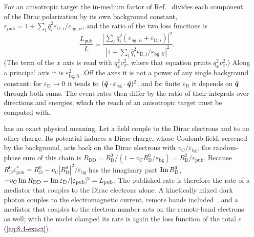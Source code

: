 For an anisotropic target the in-medium factor of Ref.~\cite[Eq.~(3.14)]{geilhufe2020dirac} divides each component of the Dirac polarization by its own background constant, $\varepsilon_{\mathrm{pub}} = 1 + \sum_i\hat q_i^2\varepsilon_{\mathrm{D},i}/\varepsilon_{\mathrm{bg},ii}$, and the ratio of the two loss functions is
\begin{equation}
  \frac{L_{\mathrm{pub}}}{L} = \frac{|\sum_i\hat q_i^2(\varepsilon_{\mathrm{bg},ii} + \varepsilon_{\mathrm{D},i})|^2}{|1 + \sum_i\hat q_i^2\varepsilon_{\mathrm{D},i}/\varepsilon_{\mathrm{bg},ii}|^2} .
  \label{eq:D.41-ratio}
\end{equation}
(The term of the $x$ axis is read with $q_x^2v_x^2$, where that equation prints $q_x^2v_z^2$.) Along a principal axis it is $\varepsilon_{\mathrm{bg},ii}^2$. Off the axes it is not a power of any single background constant: for $\varepsilon_{\mathrm{D}} \to 0$ it tends to $(\hat{\bm{q}}\cdot\varepsilon_{\mathrm{bg}}\cdot\hat{\bm{q}})^2$, and for finite $\varepsilon_{\mathrm{D}}$ it depends on $\hat{\bm{q}}$ through both sums. The event rates then differ by the ratio of their integrals over directions and energies, which the reach of an anisotropic target must be computed with.

 has an exact physical meaning. Let a field couple to the Dirac electrons and to no other charge. Its potential induces a Dirac charge, whose Coulomb field, screened by the background, acts back on the Dirac electrons with $v_{\mathrm{C}}/\varepsilon_{\mathrm{bg}}$; the random-phase sum of this chain is $R_{\mathrm{DD}} = R^0_{\mathrm{D}}/(1 - v_{\mathrm{C}}R^0_{\mathrm{D}}/\varepsilon_{\mathrm{bg}}) = R^0_{\mathrm{D}}/\varepsilon_{\mathrm{pub}}$. Because $R^0_{\mathrm{D}}\varepsilon_{\mathrm{pub}}^* = R^0_{\mathrm{D}} - v_{\mathrm{C}}|R^0_{\mathrm{D}}|^2/\varepsilon_{\mathrm{bg}}$ has the imaginary part $\operatorname{Im} R^0_{\mathrm{D}}$, $-v_{\mathrm{C}}\operatorname{Im} R_{\mathrm{DD}} = \operatorname{Im}\varepsilon_{\mathrm{D}}/|\varepsilon_{\mathrm{pub}}|^2 = L_{\mathrm{pub}}$. The published rate is therefore the rate of a mediator that couples to the Dirac electrons alone. A kinetically mixed dark photon couples to the electromagnetic current, remote bands included~\cite[Eq.~(2.1)]{hochberg2018detection}, and a mediator that couples to the electron number acts on the remote-band electrons as well; with the nuclei clamped its rate is again the loss function of the total $\varepsilon$ (\cref{eq:8.4-exact}).

